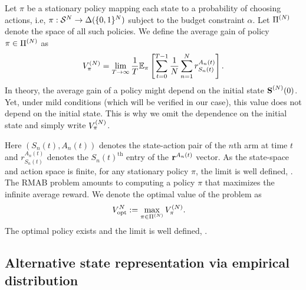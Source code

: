 Let $\pi$ be a stationary policy mapping each state to a probability of choosing actions, i.e, $\pi : \mathcal{S}^{N} \to \Delta (\{0, 1\}^{N})$ subject to the budget constraint $\alpha$. Let $\Pi^{(N)}$ denote the space of all such policies. We define the average gain of policy $\pi\in\Pi^{(N)}$ as
\begin{equation}\label{EQ::VPOLT}
    V_{\pi}^{(N)} = \lim_{T \to \infty}\frac{1}{T}\mathbb{E}_{\pi}\left[ \sum_{t = 0}^{T - 1} \frac{1}{N} \sum_{n = 1}^N r^{A_n(t)}_{S_n(t)}\right].
\end{equation}
In theory, the average gain of a policy might depend on the initial state $\textbf{S}^{(N)}(0)$. Yet, under mild conditions (which will be verified in our case), this value does not depend on the initial state. This is why we omit the dependence on the initial state and simply write $V_{\pi}^{(N)}$.
 
Here $(S_n(t), A_n(t))$ denotes the state-action pair of the $n$th arm at time $t$ and $r^{A_n(t)}_{S_n(t)}$ denotes the $S_n(t)^{\text{th}}$ entry of the $\mathbf{r}^{A_n(t)}$ vector. As the state-space and action space is finite, for any stationary policy $\pi$, the limit is well defined, \cite{puterman2014markov}. The RMAB problem amounts to computing a policy $\pi$ that maximizes the infinite average reward. We denote the optimal value of the problem as
\begin{align}\label{EQ::VOPTT}
    \Vopt{N} &:= \max_{\pi \in \pspace} \Vpol{N}.%
\end{align}
The optimal policy exists and the limit is well defined, \citet{puterman2014markov}. 

\subsection{Alternative state representation via empirical distribution}

